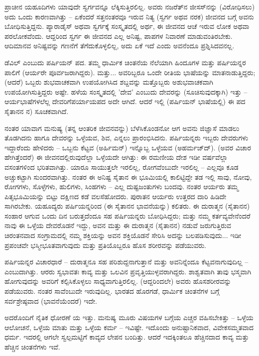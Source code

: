 ಪ್ರಾಚೀನ ಯಹೂದಿಗಳು ಯಾವುದೇ ಸ್ವರ್ಗವನ್ನೂ ಲೆಕ್ಕಿಸುತ್ತಿರಲಿಲ್ಲ. ಅವರು ನಜರೆತ್‌ನ ಜೀಸಸ್‌ನನ್ನು (ವಿರೋಧಿಸಲು) ಅದು ಒಂದು ಕಾರಣವಾಗಿತ್ತು – ಏಕೆಂದರೆ ಸತ್ತನಂತರವೂ ಇರುವ ನಿತ್ಯ (ಸ್ವರ್ಗ ಅಥವ ನರಕ) ಜೀವನದ ಬಗ್ಗೆ ಅವನು ಬೋಧಿಸುತ್ತಿದ್ದನು. ಪ್ಯಾರಾಡೈಸ್ ಅಥವಾ ಸ್ವರ್ಗಕ್ಕೆ ಸಂಸ್ಕೃತದಲ್ಲಿ ಅರ್ಥ, ಈ ಜೀವನದ ಆಚೆ ಇರುವ ಲೋಕ ಅಥವಾ ಪರಲೋಕವೆಂದು. ಆದ್ದರಿಂದ ಸ್ವರ್ಗ ಈ ಜೀವನದ ಎಲ್ಲ ಅನಿಷ್ಟ, ಪಾಪಗಳ ನಿವಾರಣೆ ಮಾಡುವಂತಿರಬೇಕು. ಆದಿಮಾನವ ಅನಿಷ್ಟವನ್ನು ಗಣನೆಗೆ ತೆಗೆದುಕೊಳ್ಳಲಿಲ್ಲ, ಅದು ಏಕೆ ಇದೆ ಎಂದು ಅವನೆಂದೂ ಪ್ರಶ್ನಿಸಿದವನಲ್ಲ.

ಡೆವಿಲ್ ಎಂಬುದು ಪರ್ಷಿಯನ್ ಪದ. ತಮ್ಮ ಧಾರ್ಮಿಕ ಚಿಂತನೆಯ ನೆಲೆಯಾಗಿ ಹಿಂದೂಗಳ ಮತ್ತು ಪರ್ಷಿಯನ್ನರ ಪಾಲಿಗೆ (ಆರ್ಯರೇ ಪೂರ್ವಜರಾಗಿದ್ದರು). ಮತ್ತು... ಅವರಿಬ್ಬರೂ ಒಂದೇ ರೀತಿಯ ಭಾಷೆಯನ್ನು ಮಾತನಾಡುತ್ತಿದ್ದರು; (ಆದರೆ) ಒಬ್ಬರು ಶುಭವಾಚಕವಾಗಿ ಉಪಯೋಗಿಸಿದ ಶಬ್ದವನ್ನು ಮತ್ತೊಬ್ಬರು ಅಶುಭವಾಚಕವಾಗಿ ಉಪಯೋಗಿಸುತ್ತಿದ್ದರು ಅಷ್ಟೇ. ಹಳೆಯ ಸಂಸ್ಕೃತದಲ್ಲಿ 'ದೇವ' ಎಂಬುದು ದೇವರನ್ನು (ಸೂಚಿಸುವುದಕ್ಕಾಗಿ) ಇತ್ತು – ಆರ್ಯಭಾಷೆಗಳಲೆಲ್ಲ ದೇವರಿಗೆ\break ಪರ್ಯಾಯಪದ ಅದೇ ಆಗಿದೆ. ಆದರೆ ಇಲ್ಲಿ (ಪರ್ಷಿಯನ್ ಭಾಷೆಯಲ್ಲಿ) ಈ ಪದ ಸೈತಾನನ ನ) ಸೂಚಕವಾಗಿದೆ.

ನಂತರ ಯಾವಾಗ ಮನುಷ್ಯ (ತನ್ನ ಆಂತರಿಕ ಜೀವನವನ್ನು) ಬೆಳೆಸಿಕೊಂಡನೋ ಆಗ ಅವನು ಜಿಜ್ಞಾಸೆ ಮಾಡಲು ತೊಡಗಿದನು ಹಾಗೂ ದೇವರನ್ನು ಒಳ್ಳೆಯವ, ಶಿವ, ಎನ್ನಲು ಪ್ರಾರಂಭಿಸಿದನು. ಪರ್ಷಿಯನ್ನರು ಇಬ್ಬರು ದೇವರುಗಳು ಇದ್ದಾರೆಂದು ಹೇಳಿದರು – ಒಬ್ಬನು ಕೆಟ್ಟವ (ಅರ್ಹಿಮನ್‌) ಇನ್ನೊಬ್ಬ ಒಳ್ಳೆಯವ (ಅಹರ್ಮಜ್‌ದ್). (ಅವರ ವಿಚಾರ ಹೇಗಿತ್ತೆಂದರೆ) ಈ ಜೀವನದಲ್ಲಿರುವುದೆಲ್ಲಾ ಒಳ್ಳೆಯದೇ ಆಗಿತ್ತು: ಈ ರಮಣೀಯ ದೇಶ ಇಡೀ ವರ್ಷವೆಲ್ಲಾ ವಸಂತಗಳಿಂದ ಭರಿತವಾಗಿತ್ತು. ಯಾರೂ ಸಾಯುತ್ತಲೇ ಇರಲಿಲ್ಲ, ರೋಗವೆಂಬುದೇ ಇರಲಿಲ್ಲ – ಎಲ್ಲವೂ ಕೂಡ ಅಚ್ಚುಕಟ್ಟಾಗಿ ಸುಂದರವಾಗಿತ್ತು. ನಂತರ ಈ ಅನಿಷ್ಟ ಸೈತಾನ ಈ ಭೂಮಿಯಲ್ಲಿ ಕಾಲಿಟ್ಟಿದ್ದೇ ತಡ ಇಲ್ಲಿ ಸಾವು, ನೋವು, ರೋಗಗಳು, ಸೊಳ್ಳೆಗಳು, ಹುಲಿಗಳು, ಸಿಂಹಗಳು – ಎಲ್ಲ ದುಷ್ಟಜಂತುಗಳು ಬಂದವು. ನಂತರ ಆರ್ಯರು ತಮ್ಮ ಪಿತೃಭೂಮಿಯನ್ನು ಬಿಟ್ಟು ದಕ್ಷಿಣದ ಕಡೆ ವಲಸೆಹೋದರು. ಪುರಾತನ ಆರ್ಯರು ಉತ್ತರದ ದಾರಿ ಹಿಡಿದೇ ಸಾಗಿರಬೇಕು. ಯಹೂದ್ಯರು ಪರ್ಷಿಯನ್ನರಿಂದ (ಈ ಸೈತಾನನ ಭಾವನೆಯನ್ನು) ಕಲಿತರು. ಈ ದುರಾತ್ಮನ (ಸೈತಾನನ) ಸಂಹಾರ ಆಗುವ ಒಂದು ದಿನ ಬರುತ್ತದೆಂದೂ ಸಹ ಪರ್ಷಿಯನ್ನರು ಬೋಧಿಸಿದ್ದರು; ಮತ್ತು ನಮ್ಮ ಕರ್ತವ್ಯವೇನೆಂದರೆ ನಾವು ಈ ಒಳ್ಳೆಯ ದೇವರೊಡನೆ ಇದ್ದು, ಅವನ ಮತ್ತು ಈ ದುರಾತ್ಮನ (ಸೈತಾನನ) ನಡುವೆ ಜರುಗುತ್ತಿರುವ ಚಿರಂತನವಾದ ಸಂಗ್ರಾಮದಲ್ಲಿ ನಮ್ಮ ಶಕ್ತಿಯನ್ನು ಅವನ ಶಕ್ತಿಯೊಡನೆ ಸೇರಿಸಿ ಅದನ್ನು ಬಲಪಡಿಸುವುದು... ಇಡೀ ಪ್ರಪಂಚವೇ ಭಸ್ಮೀಭೂತವಾಗುವುದು ಮತ್ತು ಪ್ರತಿಯೊಬ್ಬರೂ ಹೊಸ ಶರೀರವನ್ನು ಪಡೆಯುವರು.

ಪರ್ಷಿಯನ್ನರ ವಿಚಾರಧಾರೆ – ದುರಾತ್ಮನೂ ಸಹ ಪರಿಶುದ್ದನಾಗುತ್ತಾನೆ ಮತ್ತು ಅವನಿನ್ನೆಂದೂ ಕೆಟ್ಟವನಾಗುವುದಿಲ್ಲ – ಎಂಬುದಾಗಿತ್ತು. ಆರರು ಸ್ವಭಾವತಃ ಕಾವ್ಯ ಮತ್ತು ಒಲವಿನ ಪ್ರವೃತ್ತಿಯುಳ್ಳವರಾಗಿದ್ದರು. ಶಾಶ್ವತವಾಗಿ ತಾವು ಭಸ್ಮವಾಗಿ ಹೋಗುವುದನ್ನು ಅವರಿಗೆ ಕಲ್ಪಿಸಿಕೊಳ್ಳಲು ಸಾಧ್ಯವಾಗುತ್ತಿರಲಿಲ್ಲ. (ಆದ್ದರಿಂದಲೇ) ಅವರು ಹೊಸ\break ಶರೀರವನ್ನು ಪಡೆಯುವರು. ನಂತರ ಸಾವೆಂಬುದೇ ಇರುವುದಿಲ್ಲ. ಭಾರತದ ಹೊರಗಡೆ, ಧಾರ್ಮಿಕ ಚಿಂತನೆಗಳ ಬಗ್ಗೆ ಸರ್ವಶ್ರೇಷ್ಠವಾದ (ಭಾವನೆಯೆಂದರೆ) ಇದೇ.

ಅದರೊಂದಿಗೆ ನೈತಿಕ ಧೋರಣೆ ಯ ಇತ್ತು. ಮನುಷ್ಯ ಮೂರು ವಿಷಯಗಳ ಬಗ್ಗೆಯ ಎಚ್ಚರ ವಹಿಸಬೇಕಿತ್ತು – ಒಳ್ಳೆಯ ಆಲೋಚನೆ, ಒಳ್ಳೆಯ ಮಾತು ಮತ್ತು ಒಳ್ಳೆಯ ಕರ್ಮ – ಇವಿಷ್ಟೇ. ಇದೊಂದು ಅನುಷ್ಟಾನಿಕವಾದ, ವಿವೇಕಸಮ್ಮತವಾದ ಧರ್ಮ. ಇದರಲ್ಲಿ ಆಗಲೇ ಸ್ವಲ್ಪಮಟ್ಟಿಗೆ ಕಾವ್ಯದ ಲೇಪನ ಬಂದಿತ್ತು. ಆದರೆ ಇದಕ್ಕಿಂತಲೂ ಹೆಚ್ಚಿನದಾದ ಕಾವ್ಯ ಮತ್ತು ಹೆಚ್ಚಿನ ಚಿಂತನೆಗಳು ಇವೆ.

